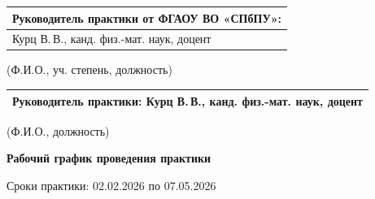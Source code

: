 \documentclass[12pt,a4paper]{article}
\begin{document}
\begin{tabularx}{\textwidth}{|>{\centering\arraybackslash}X|}
\hline
Руководитель практики от ФГАОУ ВО «СПбПУ»:\\
\hline
Курц В.\,В., канд. физ.-мат. наук, доцент\\
\hline
\end{tabularx}

\begin{center}
\footnotesize (Ф.И.О., уч. степень, должность)
\end{center}

\begin{tabularx}{\textwidth}{|X|}
\hline
Руководитель практики: Курц В.\,В., канд. физ.-мат. наук, доцент\\
\hline
\end{tabularx}

\begin{center}
\footnotesize (Ф.И.О., должность)
\end{center}

\vspace{0.8em}

\begin{center}
\textbf{Рабочий график проведения практики}
\end{center}

Сроки практики: 02.02.2026 по 07.05.2026

\vspace{0.6em}
\end{document}
